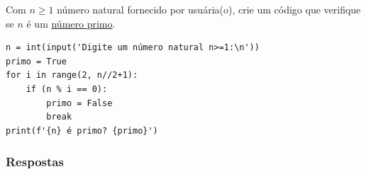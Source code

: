 \begin{exer}
  Com $n\geq 1$ número natural fornecido por usuária(o), crie um código que verifique se $n$ é um \href{https://pt.wikipedia.org/wiki/N\%C3\%BAmero_primo}{número primo}.
\end{exer}
\begin{resp}

\begin{lstlisting}
n = int(input('Digite um número natural n>=1:\n'))
primo = True
for i in range(2, n//2+1):
    if (n % i == 0):
        primo = False
        break
print(f'{n} é primo? {primo}')
\end{lstlisting}

\end{resp}

\ifisbook
\subsubsection{Respostas}
\shipoutAnswer
\fi
